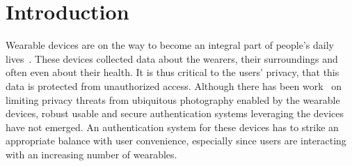 \section{Introduction}\label{sec:intro}

Wearable devices are on the way to become an integral part of people's daily lives~\cite{googleglass,smartwatch,fitbit}.
These devices collected data about the wearers, their surroundings and often even about their health.
It is thus critical to the users' privacy, that this data is protected from unauthorized access. Although there has been work~\cite{hoyle2015sensitive,hoyle2014privacy,jana2013scanner} on limiting privacy
threats from ubiquitous photography enabled by the wearable devices, robust usable and secure authentication systems
leveraging the devices have not emerged.
An authentication system for these devices has to strike an
appropriate balance with user convenience, especially since users are interacting
with an increasing number of wearables. %

